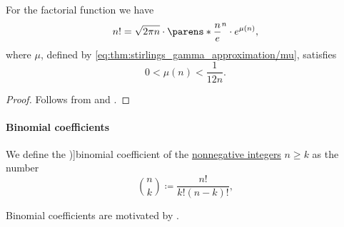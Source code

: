 \begin{theorem}\label{thm:stirlings_factorial_approximation}
  For the factorial function we have
  \begin{equation*}
    n! = \sqrt{2 \pi n} \cdot \parens*{ \frac n e }^n \cdot e^{\mu(n)},
  \end{equation*}
  where \( \mu \), defined by \eqref{eq:thm:stirlings_gamma_approximation/mu}, satisfies
  \begin{equation*}
    0 < \mu(n) < \frac 1 {12n}.
  \end{equation*}
\end{theorem}
\begin{proof}
  Follows from  and .
\end{proof}

\paragraph{Binomial coefficients}

\begin{definition}\label{def:binomial_coefficient}
  We define the \term[ru=биномиальный коеффициент (\cite[100]{БелоусовТкачёв2004ДискретнаяМатематика})]{binomial coefficient} of the \hyperref[def:integer_signum]{nonnegative integers} \( n \geq k \) as the number
  \begin{equation*}
    \binom n k \coloneqq \frac {n!} {k!(n-k)!},
  \end{equation*}
\end{definition}
\begin{comments}
  \item Binomial coefficients are motivated by .
\end{comments}

